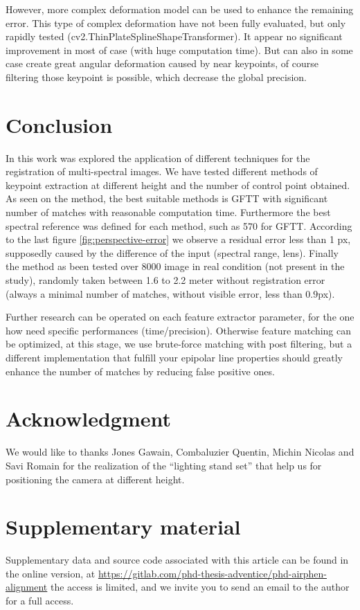 \documentclass[]{elsarticle}
\begin{document}
	However, more complex deformation model \cite{10.1007/978-3-642-33709-3_3} can be used to enhance the remaining error.
	This type of complex deformation have not been fully evaluated, but only rapidly tested (cv2.ThinPlateSplineShapeTransformer).
	It appear no significant improvement in most of case (with huge computation time).
	But can also in some case create great angular deformation caused by near keypoints,
	of course filtering those keypoint is possible, which decrease the global precision.
	
	
	\section{Conclusion}
	
	In this work was explored the application of different techniques for the registration of multi-spectral images.
	We have tested different methods of keypoint extraction at different height and the number of control point obtained.
	As seen on the method, the best suitable methods is GFTT with significant number of matches with reasonable computation time.
	Furthermore the best spectral reference was defined for each method, such as 570 for GFTT.
	According to the last figure \ref{fig:perspective-error} we observe a residual error less than 1 px,
	supposedly caused by the difference of the input (spectral range, lens).
	Finally the method as been tested over 8000 image in real condition (not present in the study),
	randomly taken between 1.6 to 2.2 meter without registration error (always a minimal number of matches, without visible error, less than $0.9$px).
	\\
	\par Further research can be operated on each feature extractor parameter, for the one how need specific performances (time/precision).
	Otherwise feature matching can be optimized, at this stage, we use brute-force matching with post filtering,
	but a different implementation that fulfill your epipolar line properties should greatly enhance the number of matches by reducing false positive ones.
	
	\section{Acknowledgment}
	
	We would like to thanks Jones Gawain, Combaluzier Quentin, Michin Nicolas and Savi Romain
	for the realization of the ``lighting stand set'' that help us for positioning the camera at different height.
	
	\section{Supplementary material}
	
	Supplementary data and source code associated with this article can be found in the online version, at
	\url{https://gitlab.com/phd-thesis-adventice/phd-airphen-alignment} the access is limited,
	and we invite you to send an email to the author for a full access.
	
	
	
	
\end{document}
